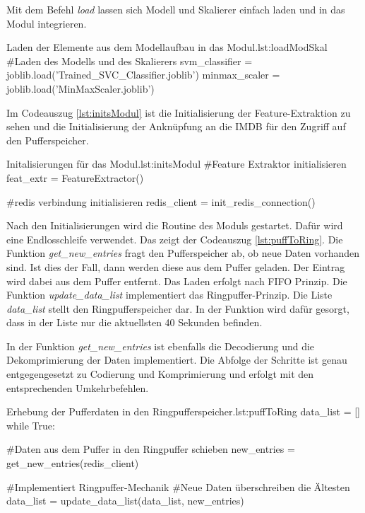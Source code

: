 Mit dem Befehl \textit{load} lassen sich Modell und Skalierer einfach laden und in das Modul integrieren. 

\begin{pythoncode}{Laden der Elemente aus dem Modellaufbau in das Modul.}{lst:loadModSkal}
#Laden des Modells und des Skalierers
svm_classifier = joblib.load('Trained_SVC_Classifier.joblib') 
minmax_scaler = joblib.load('MinMaxScaler.joblib')
\end{pythoncode}

Im Codeauszug \ref{lst:initsModul} ist die Initialisierung der Feature-Extraktion zu sehen und die Initialisierung der Anknüpfung an die IMDB für den Zugriff auf den Pufferspeicher. 

\begin{pythoncode}{Initalisierungen für das Modul.}{lst:initsModul}
#Feature Extraktor initialisieren
feat_extr = FeatureExtractor()

#redis verbindung initialisieren
redis_client = init_redis_connection()
\end{pythoncode}

Nach den Initialisierungen wird die Routine des Moduls gestartet. Dafür wird eine Endlosschleife verwendet. Das zeigt der Codeauszug \ref{lst:puffToRing}. Die Funktion \textit{get\_new\_entries} fragt den Pufferspeicher ab, ob neue Daten vorhanden sind. Ist dies der Fall, dann werden diese aus dem Puffer geladen. Der Eintrag wird dabei aus dem Puffer entfernt. Das Laden erfolgt nach FIFO Prinzip. Die Funktion \textit{update\_data\_list} implementiert das Ringpuffer-Prinzip. Die Liste \textit{data\_list} stellt den Ringpufferspeicher dar. In der Funktion wird dafür gesorgt, dass in der Liste nur die aktuellsten 40 Sekunden befinden.  \par

In der Funktion \textit{get\_new\_entries} ist ebenfalls die Decodierung und die Dekomprimierung der Daten implementiert. Die Abfolge der Schritte ist genau entgegengesetzt zu Codierung und Komprimierung und erfolgt mit den entsprechenden Umkehrbefehlen.

\begin{pythoncode}{Erhebung der Pufferdaten in den Ringpufferspeicher.}{lst:puffToRing}
data_list = []
while True:

    #Daten aus dem Puffer in den Ringpuffer schieben
    new_entries = get_new_entries(redis_client)

    #Implementiert Ringpuffer-Mechanik
    #Neue Daten überschreiben die Ältesten
    data_list = update_data_list(data_list, new_entries)
\end{pythoncode}

